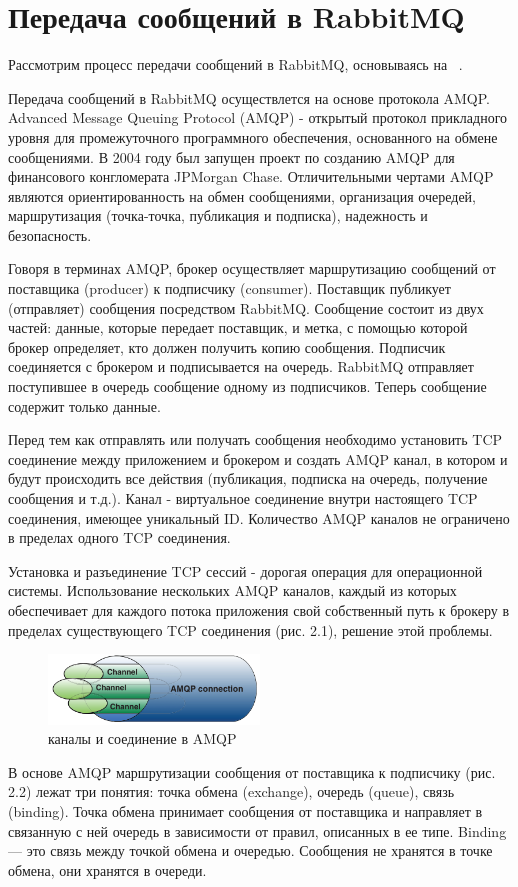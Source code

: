 \section{Передача сообщений в RabbitMQ} 
Рассмотрим процесс передачи сообщений в RabbitMQ, основываясь на ~\cite{rabbitmq_in_action}.\par
Передача сообщений в RabbitMQ осуществлется на основе протокола AMQP. Advanced Message Queuing Protocol (AMQP) - открытый протокол прикладного уровня для промежуточного программного обеспечения, основанного на обмене сообщениями. В 2004 году был запущен проект по созданию AMQP для финансового конгломерата JPMorgan Chase. Отличительными чертами AMQP являются ориентированность на обмен сообщениями, организация очередей, маршрутизация (точка-точка, публикация и подписка), надежность и безопасность. \par
Говоря в терминах AMQP, брокер осуществляет маршрутизацию сообщений от поставщика (producer) к подписчику (consumer). Поставщик публикует (отправляет) сообщения посредством RabbitMQ. Сообщение состоит из двух частей: данные, которые передает поставщик, и метка, с помощью которой брокер определяет, кто должен получить копию сообщения. Подписчик соединяется с брокером и подписывается на очередь. RabbitMQ отправляет поступившее в очередь сообщение одному из подписчиков. Теперь сообщение содержит только данные.\par
Перед тем как отправлять или получать сообщения необходимо установить TCP соединение между приложением и брокером и создать AMQP канал, в котором и будут происходить все действия (публикация, подписка на очередь, получение сообщения и т.д.). Канал - виртуальное соединение внутри настоящего TCP соединения, имеющее уникальный ID. Количество AMQP каналов не ограничено в пределах одного TCP соединения.\par 
Установка и разъединение TCP сессий - дорогая операция для операционной системы. Использование нескольких AMQP каналов, каждый из которых обеспечивает  для каждого потока приложения свой собственный путь к брокеру в пределах существующего TCP соединения (рис. 2.1), решение этой проблемы.\par

\begin{figure}
\centering
\includegraphics[width=0.5\textwidth]{img/channels.png}
\caption{каналы и соединение в AMQP}
\end{figure}
В основе AMQP маршрутизации сообщения от поставщика к подписчику (рис. 2.2) лежат три понятия: точка обмена (exchange), очередь (queue), связь (binding). Точка обмена принимает сообщения от поставщика и направляет в связанную с ней очередь в зависимости от правил, описанных в ее типе. Binding --- это связь между точкой обмена и очередью. Сообщения не хранятся в точке обмена, они хранятся в очереди.

